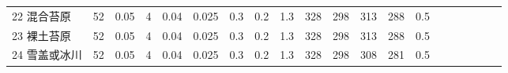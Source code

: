 \begin{landscape}
\begin{table}[htbp]
\begin{tabular}{@{}lccccccccccccccccccc@{}}
      22 混合苔原               & 52                   & 0.05     & 4   & 0.04 & 0.025               & 0.3   & 0.2   & 1.3   & 328               & 298               & 313                 & 288                & 0.5                \\
      23 裸土苔原               & 52                   & 0.05     & 4   & 0.04 & 0.025               & 0.3   & 0.2   & 1.3   & 328               & 298               & 313                 & 288                & 0.5                \\
      24 雪盖或冰川             & 52                   & 0.05     & 4   & 0.04 & 0.025               & 0.3   & 0.2   & 1.3   & 328               & 298               & 308                 & 281                & 0.5                \\ \bottomrule
    \end{tabular}
  \end{table}
\end{landscape}

